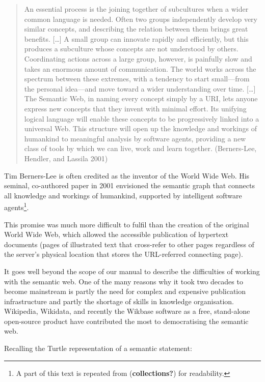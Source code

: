 \documentclass[
  letterpaper,
  DIV=11,
  numbers=noendperiod]{scrreprt}
\begin{document}
\begin{quote}
An essential process is the joining together of subcultures when a wider
common language is needed. Often two groups independently develop very
similar concepts, and describing the relation between them brings great
benefits. {[}\ldots{]} A small group can innovate rapidly and
efficiently, but this produces a subculture whose concepts are not
understood by others. Coordinating actions across a large group,
however, is painfully slow and takes an enormous amount of
communication. The world works across the spectrum between these
extremes, with a tendency to start small---from the personal idea---and
move toward a wider understanding over time. {[}\ldots{]} The Semantic
Web, in naming every concept simply by a URI, lets anyone express new
concepts that they invent with minimal effort. Its unifying logical
language will enable these concepts to be progressively linked into a
universal Web. This structure will open up the knowledge and workings of
humankind to meaningful analysis by software agents, providing a new
class of tools by which we can live, work and learn together.
(Berners-Lee, Hendler, and Lassila 2001)
\end{quote}

Tim Berners-Lee is often credited as the inventor of the World Wide Web.
His seminal, co-authored paper in 2001 envisioned the semantic graph
that connects all knowledge and workings of humankind, supported by
intelligent software agents\footnote{A part of this text is repeated
  from (\textbf{collections?}) for readability.}.

This promise was much more difficult to fulfil than the creation of the
original World Wide Web, which allowed the accessible publication of
hypertext documents (pages of illustrated text that cross-refer to other
pages regardless of the server's physical location that stores the
URL-referred connecting page).

It goes well beyond the scope of our manual to describe the difficulties
of working with the semantic web. One of the many reasons why it took
two decades to become mainstream is partly the need for complex and
expensive publication infrastructure and partly the shortage of skills
in knowledge organisation. Wikipedia, Wikidata, and recently the Wikbase
software as a free, stand-alone open-source product have contributed the
most to democratising the semantic web.

Recalling the Turtle representation of a semantic statement:
\end{document}
